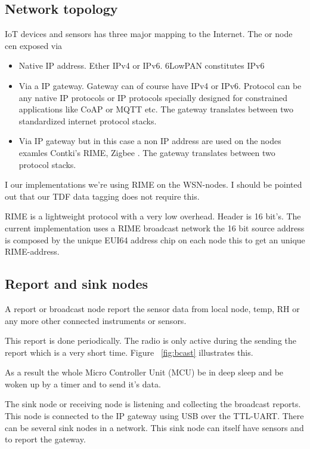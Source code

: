 \documentclass[conference, a4paper,10pt,twocolumn]{IEEEtran}
\begin{document}
\subsection{Network topology}

IoT devices and sensors has three major mapping to the Internet. The 
or node cen exposed via

\begin{itemize}

\item Native IP address. Ether IPv4 or IPv6. 6LowPAN constitutes IPv6


\item Via a IP gateway. Gateway can of course have IPv4 or IPv6. Protocol
can be any native IP protocols or IP protocols specially designed 
for constrained applications like CoAP or MQTT etc. The gateway 
translates between two standardized internet protocol stacks. 


\item  Via IP gateway but in this case a non IP address are used on
the nodes examles Contki's RIME, Zigbee . The gateway translates 
between two protocol stacks. 

\end{itemize}

I our implementations we're using RIME on the WSN-nodes. I should
be pointed out that our TDF data tagging does not require this.

RIME is a lightweight protocol with a very low overhead. Header is 
16 bit's. The current implementation uses a RIME broadcast network
the 16 bit source address is composed by the unique EUI64 address
chip on each node this to get an unique RIME-address. 

\subsection{Report and sink nodes}

A report or broadcast node report the sensor data from local 
node, temp, RH or any more other connected instruments or 
sensors.

This report is done periodically. The radio is only active
during the sending the report which is a very short time.
Figure ~\ref{fig:bcast} illustrates this.

As a result the whole Micro Controller Unit (MCU) be in deep 
sleep and be woken up by a timer and to send it's data.

The sink node or receiving node is listening and collecting
the broadcast reports. This node is connected to the IP gateway
using USB over the TTL-UART.  There can be several sink nodes
in a network. This sink node can itself have sensors and to
report the gateway.
\end{document}
